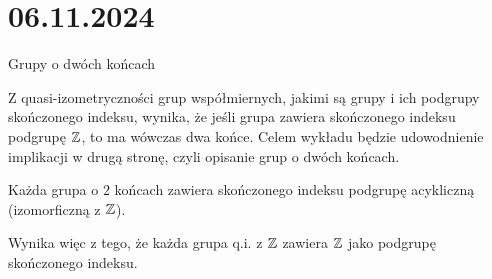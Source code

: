 \section{06.11.2024}{Grupy o dwóch końcach}

Z quasi-izometryczności grup współmiernych, jakimi są grupy i ich podgrupy skończonego indeksu, wynika, że jeśli grupa zawiera skończonego indeksu podgrupę $\mathbb{Z}$, to ma wówczas dwa końce. Celem wykładu będzie udowodnienie implikacji w drugą stronę, czyli opisanie grup o dwóch końcach.

\begin{theorem}{}{}
  Każda grupa o $2$ końcach zawiera skończonego indeksu podgrupę acykliczną (izomorficzną z $\mathbb{Z}$).
\end{theorem}

Wynika więc z tego, że każda grupa q.i. z $\mathbb{Z}$ zawiera $\mathbb{Z}$ jako podgrupę skończonego indeksu.


